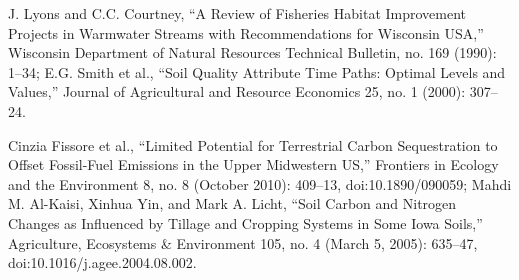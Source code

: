 \documentclass[11pt]{article}
\begin{document}
\begin{thebibliography}{1}
    J. Lyons and C.C. Courtney, “A Review of Fisheries Habitat Improvement Projects in Warmwater Streams with Recommendations for Wisconsin USA,” Wisconsin Department of Natural Resources Technical Bulletin, no. 169 (1990): 1–34; E.G. Smith et al., “Soil Quality Attribute Time Paths: Optimal Levels and Values,” Journal of Agricultural and Resource Economics 25, no. 1 (2000): 307–24.
  
\begin{equation}
 
  \end{equation}  Cinzia Fissore et al., “Limited Potential for Terrestrial Carbon Sequestration to Offset Fossil-Fuel Emissions in the Upper Midwestern US,” Frontiers in Ecology and the Environment 8, no. 8 (October 2010): 409–13, doi:10.1890/090059; Mahdi M. Al-Kaisi, Xinhua Yin, and Mark A. Licht, “Soil Carbon and Nitrogen Changes as Influenced by Tillage and Cropping Systems in Some Iowa Soils,” Agriculture, Ecosystems & Environment 105, no. 4 (March 5, 2005): 635–47, doi:10.1016/j.agee.2004.08.002.
  
\end{thebibliography}
\end{document}

